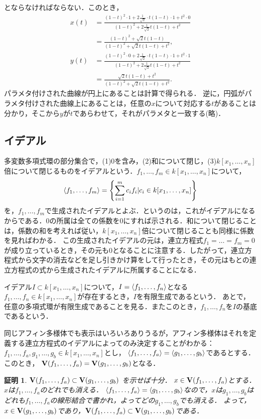 \documentclass[9pt]{ltjsarticle}
\theoremstyle{break}
\theoremstyle{break}
\theoremstyle{break}
\theoremstyle{break}
\theoremstyle{break}
\theoremstyle{break}
\theoremstyle{break}
\theoremstyle{break}
\theoremstyle{break}
\theoremstyle{break}
\theoremstyle{break}
\theoremstyle{break}
\theoremstyle{break}
\theoremstyle{break}
\theoremstyle{break}
\theoremstyle{nonumberbreak}
\newtheorem{myproof}{証明}
\theoremstyle{nonumberbreak}
\begin{document}
\begin{enumerate}[label=(問題\arabic*)]
とならなければならない．このとき，
\begin{align}
 x(t)&=
\frac{(1-t)^2\cdot 1 + 2\frac{1}{\sqrt{2}}\cdot t(1-t)\cdot 1 + t^2 \cdot 0}{(1-t)^2 + 2\frac{1}{\sqrt{2}}t(1-t)+t^2}\\
 & =
\frac{(1-t)^2 + \sqrt{2}t(1-t)}{(1-t)^2 + \sqrt{2}t(1-t)+t^2},\\
 y(t)& =
\frac{(1-t)^2 \cdot 0 + 2\frac{1}{\sqrt{2}}\cdot t(1-t)\cdot 1 + t^2 \cdot 1}{(1-t)^2 + 2\frac{1}{\sqrt{2}}t(1-t)+t^2}\\
 & =
\frac{\sqrt{2}t(1-t)+t^2}{(1-t)^2 + \sqrt{2}t(1-t) + t^2}.
\end{align}
パラメタ付けされた曲線が円上にあることは計算で得られる．
逆に，円弧がパラメタ付けされた曲線上にあることは，任意の$x$について対応する$t$があることは分かり，そこから$y$が$t$であらわせて，それがパラメタと一致する(略)．
\end{enumerate}

\subsection{イデアル}
多変数多項式環の部分集合で，(1)0を含み，(2)和について閉じ，(3)$k[x_1,\dots,x_n]$倍について閉じるものをイデアルという．$f_1,\dots,f_m \in k[x_1,\dots,x_n]$について，
\begin{align}
 \langle f_1,\dots,f_m \rangle = \left\{\sum_{i=1}^m c_i f_i | c_i \in k[x_1,\dots,x_n]\right\}
\end{align}
を，$f_1,\dots,f_m$で生成されたイデアルとよぶ．というのは，これがイデアルになるからである．0の所属は全ての係数を0にすれば示される．和について閉じることは，係数の和を考えれば従い，$k[x_1,\dots,x_n]$倍について閉じることも同様に係数を見ればわかる．
この生成されたイデアルの元は，連立方程式$f_1=\dots = f_m = 0$が成り立っているとき，その元も0となることに注意する．したがって，連立方程式から文字の消去などを足し引きかけ算をして行ったとき，その元はもとの連立方程式の式から生成されたイデアルに所属することになる．

イデアル$I \subset k[x_1,\dots,x_n]$について，$I=\langle f_1,\dots,f_n \rangle$となる$f_1,\dots, f_n \in k[x_1,\dots,x_n]$が存在するとき，$I$を有限生成であるという．
あとで，任意の多項式環が有限生成であることを見る．またこのとき，$f_1,\dots,f_n$を$I$の基底であるという．

同じアフィン多様体でも表示はいろいろありうるが，アフィン多様体はそれを定義する連立方程式のイデアルによってのみ決定することがわかる：
$f_1,\dots,f_a,g_1,\dots,g_b \in k[x_1,\dots,x_n]$とし，
$\langle f_1,\dots,f_a \rangle=\langle g_1,\dots,g_b \rangle$であるとする．このとき，
$\textbf V(f_1,\dots,f_a)=\textbf V(g_1,\dots,g_b)$となる．
\begin{myproof}
$\textbf V(f_1,\dots,f_a)\subset \textbf V(g_1,\dots,g_b)$ を示せば十分．
$x\in\textbf V(f_1,\dots,f_a)$とする．$x$は$f_1,\dots,f_a$のどれでも消える．
$\langle f_1,\dots,f_a \rangle=\langle g_1,\dots,g_b \rangle$なので，$x$は$g_1,\dots,g_b$は
どれも$f_1,\dots,f_a$の線形結合で書かれ，よってどの$g_1,\dots,g_b$でも消える．
よって，$x\in \textbf V(g_1,\dots,g_b)$であり，$\textbf V(f_1,\dots,f_a)\subset \textbf V(g_1,\dots,g_b)$である．
\end{myproof}
\end{document}
